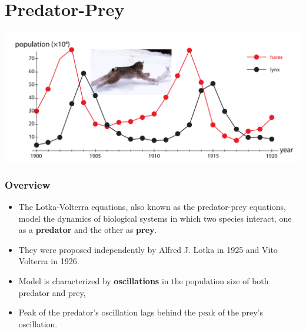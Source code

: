 \section{Predator-Prey}

\begin{frame}
\begin{center}
    \includegraphics[scale=0.25]{lesson_2/images/predator_plot.png}
\end{center}
    
\end{frame}

\begin{frame}
    \frametitle{Overview}
    \begin{itemize}
        \item The Lotka-Volterra equations, also known as the predator-prey equations, model the dynamics of biological systems in which two species interact, one as a \textbf{predator} and the other as \textbf{prey}.
        \item They were proposed independently by Alfred J. Lotka in 1925 and Vito Volterra in 1926.
        \item   Model is characterized by \textbf{oscillations} in the population size of both predator and prey,
        \item Peak of the predator's oscillation lags  behind the peak of the prey's oscillation.
    \end{itemize}
\end{frame}

